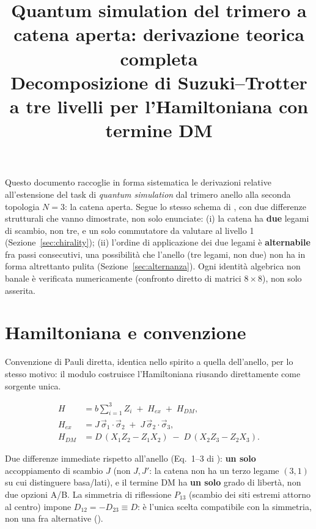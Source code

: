 \documentclass[11pt,a4paper]{article}
\title{Quantum simulation del trimero a catena aperta: derivazione teorica completa\\
\large Decomposizione di Suzuki--Trotter a tre livelli per l'Hamiltoniana con termine DM}
\author{}
\date{}
\begin{document}
\maketitle
\tableofcontents

\bigskip
\noindent Questo documento raccoglie in forma sistematica le derivazioni relative all'estensione del task di \emph{quantum simulation} dal trimero anello alla seconda topologia $N=3$: la catena aperta. Segue lo stesso schema di \texttt{}, con due differenze strutturali che vanno dimostrate, non solo enunciate: (i) la catena ha \textbf{due} legami di scambio, non tre, e un solo commutatore da valutare al livello 1 (Sezione~\ref{sec:chirality}); (ii) l'ordine di applicazione dei due legami è \textbf{alternabile} fra passi consecutivi, una possibilità che l'anello (tre legami, non due) non ha in forma altrettanto pulita (Sezione~\ref{sec:alternanza}). Ogni identità algebrica non banale è verificata numericamente (confronto diretto di matrici $8\times8$), non solo asserita.

\section{Hamiltoniana e convenzione}
\label{sec:hamiltoniana}

Convenzione di Pauli diretta, identica nello spirito a quella dell'anello, per lo stesso motivo: il modulo \texttt{} costruisce l'Hamiltoniana riusando direttamente \texttt{} come sorgente unica.

\begin{align}
H &= b\sum_{i=1}^3 Z_i \;+\; H_{ex} \;+\; H_{DM}, \label{eq:H-full}\\[4pt]
H_{ex} &= J\,\vec\sigma_1\!\cdot\!\vec\sigma_2 \;+\; J\,\vec\sigma_2\!\cdot\!\vec\sigma_3, \label{eq:Hex-def}\\[4pt]
H_{DM} &= D\,(X_1Z_2{-}Z_1X_2) \;-\; D\,(X_2Z_3{-}Z_2X_3). \label{eq:HDM-def}
\end{align}

Due differenze immediate rispetto all'anello (Eq.~1--3 di \texttt{}): \textbf{un solo} accoppiamento di scambio $J$ (non $J,J'$: la catena non ha un terzo legame $(3,1)$ su cui distinguere basa/lati), e il termine DM ha \textbf{un solo} grado di libertà, non due opzioni A/B. La simmetria di riflessione $P_{13}$ (scambio dei siti estremi attorno al centro) impone $D_{12}=-D_{23}\equiv D$: è l'unica scelta compatibile con la simmetria, non una fra alternative (\texttt{}).
\end{document}
